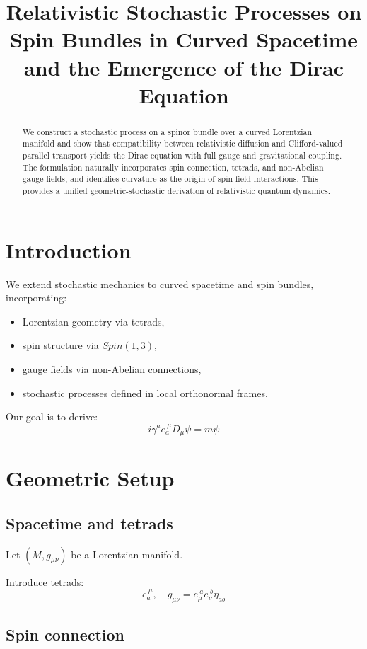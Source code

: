 \documentclass[11pt]{article}
\title{Relativistic Stochastic Processes on Spin Bundles in Curved Spacetime and the Emergence of the Dirac Equation}
\author{}
\date{}
\begin{document}
\maketitle
\begin{abstract}
We construct a stochastic process on a spinor bundle over a curved
Lorentzian manifold and show that compatibility between relativistic
    diffusion and Clifford-valued parallel transport yields the Dirac
    equation with full gauge and gravitational coupling. The formulation
    naturally incorporates spin connection, tetrads, and non-Abelian gauge
    fields, and identifies curvature as the origin of spin-field
    interactions. This provides a unified geometric-stochastic derivation
    of relativistic quantum dynamics.
\end{abstract}

\tableofcontents

\section{Introduction}

We extend stochastic mechanics to curved spacetime and spin bundles,
incorporating:
\begin{itemize}
\item Lorentzian geometry via tetrads,
\item spin structure via $Spin(1,3)$,
\item gauge fields via non-Abelian connections,
\item stochastic processes defined in local orthonormal frames.
\end{itemize}

Our goal is to derive:
\[
i \gamma^a e_a^{\ \mu} D_\mu \psi = m \psi
\]

\section{Geometric Setup}

\subsection{Spacetime and tetrads}

Let $(M,g_{\mu\nu})$ be a Lorentzian manifold.

Introduce tetrads:
\[
e_a^{\ \mu}, \quad g_{\mu\nu} = e_\mu^{\ a} e_\nu^{\ b} \eta_{ab}
\]

\subsection{Spin connection}
\end{document}
